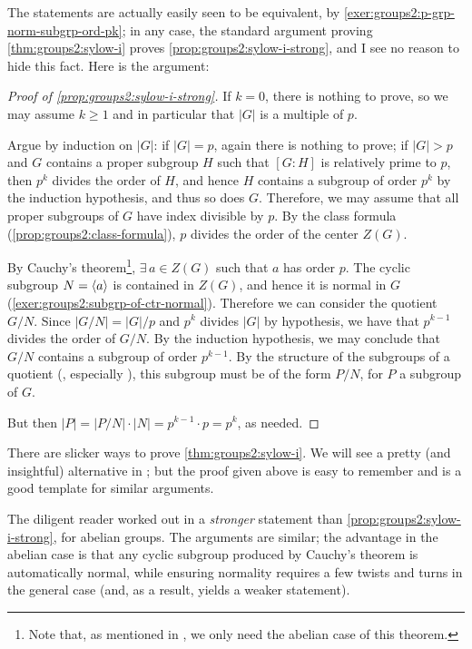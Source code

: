 The statements are actually easily seen to be equivalent, by
\cref{exer:groups2:p-grp-norm-subgrp-ord-pk}; in any case, the
standard argument proving \cref{thm:groups2:sylow-i} proves
\cref{prop:groups2:sylow-i-strong}, and I see no reason to hide this
fact. Here is the argument:
\begin{proof}[Proof of \cref{prop:groups2:sylow-i-strong}]
  If $k = 0$, there is nothing to prove, so we may assume $k \geq 1$
  and in particular that $|G|$ is a multiple of $p$.

  Argue by induction on $|G|$: if $|G| = p$, again there is nothing to
  prove; if $|G| > p$ and $G$ contains a proper subgroup $H$ such that
  $[G : H]$ is relatively prime to $p$, then $p^k$ divides the order
  of $H$, and hence $H$ contains a subgroup of order $p^k$ by the
  induction hypothesis, and thus so does $G$.  Therefore, we may
  assume that all proper subgroups of $G$ have index divisible by
  $p$. By the class formula (\cref{prop:groups2:class-formula}), $p$
  divides the order of the center $Z(G)$.

  By Cauchy's theorem\footnote{Note that, as mentioned in
    , we only need the
    abelian case of this theorem.}, $\exists\, a \in Z(G)$ such that
  $a$ has order $p$. The cyclic subgroup $N = \langle a\rangle$ is contained
  in $Z(G)$, and hence it is normal in $G$
  (\cref{exer:groups2:subgrp-of-ctr-normal}). Therefore we can
  consider the quotient $G/N$.  Since $|G/N| = |G|/p$ and $p^k$
  divides $|G|$ by hypothesis, we have that $p^{k-1}$ divides the
  order of $G/N$. By the induction hypothesis, we may conclude that
  $G/N$ contains a subgroup of order $p^{k-1}$. By the structure of
  the subgroups of a quotient
  (, especially
  ), this subgroup
  must be of the form $P/N$, for $P$ a subgroup of $G$.

  But then $|P| = |P/N| \cdot |N| = p^{k-1} \cdot p = p^k$, as needed.
\end{proof}
There are slicker ways to prove \cref{thm:groups2:sylow-i}. We will
see a pretty (and insightful) alternative in
; but the proof given above is easy
to remember and is a good template for similar arguments.

\begin{rem}{}{}
  The diligent reader worked out in
   a \emph{stronger}
  statement than \cref{prop:groups2:sylow-i-strong}, for abelian
  groups. The arguments are similar; the advantage in the abelian case
  is that any cyclic subgroup produced by Cauchy's theorem is
  automatically normal, while ensuring normality requires a few twists
  and turns in the general case (and, as a result, yields a weaker
  statement).
\end{rem}

